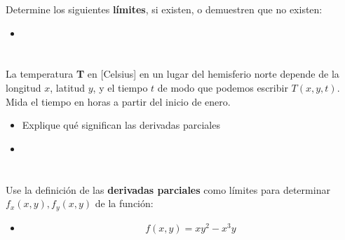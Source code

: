 \documentclass[12pt]{article}
\begin{document}
Determine los siguientes \textbf{límites}, si existen, o demuestren que no existen:

\begin{itemize}[format=\textbf]

\item

\end{itemize}

\section{}

La temperatura \textbf{T} en [Celsius] en un lugar del hemisferio norte depende de la longitud $x$, latitud $y$, y el tiempo $t$ de modo que podemos escribir $T(x, y, t)$. Mida el tiempo en horas a partir del inicio de enero.

\begin{itemize}[format=\textbf]

\item Explique qué significan las derivadas parciales

\item

\end{itemize}

\section{}

Use la definición de las \textbf{derivadas parciales} como límites para determinar $f_x(x, y), f_y(x, y)$ de la función:

\begin{itemize}[format=\textbf]

\item $$f(x, y) = xy^2 − x^3y$$

\end{itemize}

\section{}

\end{document}
